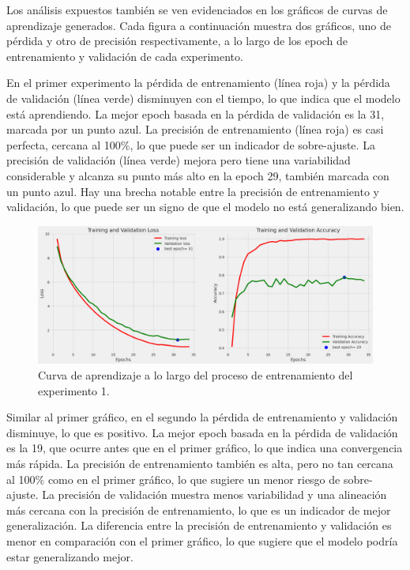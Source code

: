 Los análisis expuestos también se ven evidenciados en los gráficos de curvas de aprendizaje generados. Cada figura a continuación muestra dos gráficos, uno de pérdida y otro de precisión respectivamente, a lo largo de los epoch de entrenamiento y validación de cada experimento.

En el primer experimento la pérdida de entrenamiento (línea roja) y la pérdida de validación (línea verde) disminuyen con el tiempo, lo que indica que el modelo está aprendiendo. La mejor epoch basada en la pérdida de validación es la 31, marcada por un punto azul. La precisión de entrenamiento (línea roja) es casi perfecta, cercana al 100\%, lo que puede ser un indicador de sobre-ajuste. La precisión de validación (línea verde) mejora pero tiene una variabilidad considerable y alcanza su punto más alto en la epoch 29, también marcada con un punto azul. Hay una brecha notable entre la precisión de entrenamiento y validación, lo que puede ser un signo de que el modelo no está generalizando bien.

\begin{figure}[ht]%
    \begin{center}
        \includegraphics[width=1\textwidth]{./Graphics/training&validation_p1.png}
        \caption{Curva de aprendizaje a lo largo del proceso de entrenamiento del experimento 1.\label{fig:training_validation_loss}}
    \end{center}
\end{figure}

Similar al primer gráfico, en el segundo la pérdida de entrenamiento y validación disminuye, lo que es positivo. La mejor epoch basada en la pérdida de validación es la 19, que ocurre antes que en el primer gráfico, lo que indica una convergencia más rápida. La precisión de entrenamiento también es alta, pero no tan cercana al 100\% como en el primer gráfico, lo que sugiere un menor riesgo de sobre-ajuste. La precisión de validación muestra menos variabilidad y una alineación más cercana con la precisión de entrenamiento, lo que es un indicador de mejor generalización. La diferencia entre la precisión de entrenamiento y validación es menor en comparación con el primer gráfico, lo que sugiere que el modelo podría estar generalizando mejor.

